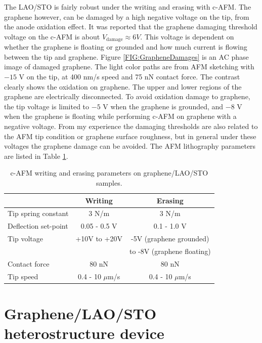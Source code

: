 \documentclass[pdflatex, sectionletters, 12pt]{pittetd}    %
\begin{document}
The LAO/STO is fairly robust under the writing and erasing with c-AFM. The graphene however, can be damaged by a high negative voltage on the tip, from the anode oxidation effect\cite{alaboson2011conductive, byun2011nanoscale}. It was reported\cite{alaboson2011conductive} that the graphene damaging threshold voltage on the c-AFM is about $V_{\mathrm{damage}} \approx 6 V$. This voltage is dependent on whether the graphene is floating or grounded and how much current is flowing between the tip and graphene. Figure \ref{FIG:GrapheneDamages} is an AC phase image of damaged graphene. The light color paths are from AFM sketching with $-15$ V on the tip, at 400 nm/s speed and 75 nN contact force. The contrast clearly shows the oxidation on graphene. The upper and lower regions of the graphene are electrically disconnected. To avoid oxidation damage to graphene, the tip voltage is limited to $-5$ V when the graphene is grounded, and $-8$ V when the graphene is floating while performing c-AFM on graphene with a negative voltage. From my experience the damaging thresholds are also related to the AFM tip condition or graphene surface roughness, but in general under these voltages the graphene damage can be avoided. The AFM lithography parameters are listed in Table \ref{TAB:GCOLithography}.

\begin{table}[h!]
	\centering
	\begin{tabular}{l|cc}
		\hline
				&	Writing	&	Erasing \\ \hline
		Tip spring constant	&	3 N/m	& 3 N/m	\\ 
		Deflection set-point	&	0.05 - 0.5 V	&	0.1 - 1.0 V	\\	
		Tip voltage	&	+10V to +20V	& -5V (graphene grounded) \\
			&	& to -8V (graphene floating) \\
		Contact force	&	80 nN	&	80 nN	\\
		Tip speed	&	0.4 - 10 $\mu$m/s	&	0.4 - 10 $\mu$m/s \\ 
	\end{tabular}
	\caption{c-AFM writing and erasing parameters on graphene/LAO/STO samples.}
	\label{TAB:GCOLithography}
	
\end{table}

\chapter{Graphene/LAO/STO heterostructure device}
\label{SEC:GCO}
\end{document}
